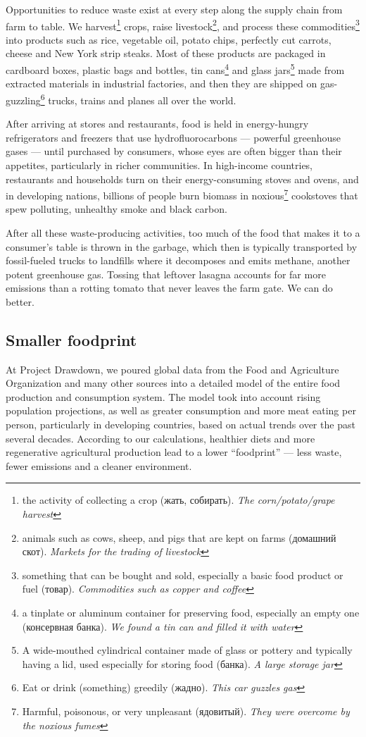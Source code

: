 \documentclass[a4paper]{article}
\begin{document}
Opportunities to reduce waste exist at every step along the supply chain from farm to table. We harvest\footnote{the activity of collecting a crop (жать, собирать).\emph{ The corn/potato/grape harvest}} crops, raise livestock\footnote{animals such as cows, sheep, and pigs that are kept on farms (домашний скот).\emph{ Markets for the trading of livestock}}, and process these commodities\footnote{something that can be bought and sold, especially a basic food product or fuel (товар).\emph{ Commodities such as copper and coffee}} into products such as rice, vegetable oil, potato chips, perfectly cut carrots, cheese and New York strip steaks. Most of these products are packaged in cardboard boxes, plastic bags and bottles, tin cans\footnote{
	a tinplate or aluminum container for preserving food, especially an empty one (консервная банка). \emph{We found a tin can and filled it with water}} and glass jars\footnote{A wide-mouthed cylindrical container made of glass or pottery and typically having a lid, used especially for storing food (банка).\emph{ A large storage jar}} made from extracted materials in industrial factories, and then they are shipped on gas-guzzling\footnote{Eat or drink (something) greedily (жадно). \emph{This car guzzles gas}} trucks, trains and planes all over the world.

	After arriving at stores and restaurants, food is held in energy-hungry refrigerators and freezers that use hydrofluorocarbons --- powerful greenhouse gases --- until purchased by consumers, whose eyes are often bigger than their appetites, particularly in richer communities. In high-income countries, restaurants and households turn on their energy-consuming stoves and ovens, and in developing nations, billions of people burn biomass in noxious\footnote{Harmful, poisonous, or very unpleasant (ядовитый). \emph{They were overcome by the noxious fumes}} cookstoves that spew polluting, unhealthy smoke and black carbon.

After all these waste-producing activities, too much of the food that makes it to a consumer's table is thrown in the garbage, which then is typically transported by fossil-fueled trucks to landfills where it decomposes and emits methane, another potent greenhouse gas. Tossing that leftover lasagna accounts for far more emissions than a rotting tomato that never leaves the farm gate. We can do better.

\subsection*{Smaller foodprint}
At Project Drawdown, we poured global data from the Food and Agriculture Organization and many other sources into a detailed model of the entire food production and consumption system. The model took into account rising population projections, as well as greater consumption and more meat eating per person, particularly in developing countries, based on actual trends over the past several decades. According to our calculations, healthier diets and more regenerative agricultural production lead to a lower “foodprint” --- less waste, fewer emissions and a cleaner environment.
\end{document}
